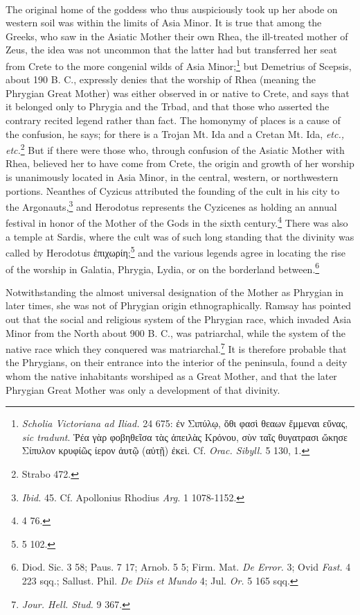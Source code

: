 \documentclass[a4paper, 11pt, oneside, polutonikogreek, english]{article}
\begin{document}
\paragraph{}
The original home of the goddess who thus auspiciously took up her abode on western soil was within the limits of Asia Minor. It is true that among the Greeks, who saw in the Asiatic Mother their own Rhea, the ill-treated mother of Zeus, the idea was not uncommon that the latter had but transferred her seat from Crete to the more congenial wilds of Asia Minor;\footnote{\emph{Scholia Victoriana ad Iliad.} 24 675: ἐν Σιπύλῳ, ὅθι φασὶ θεαων ἔμμεναι εὔνας, \emph{sic tradunt}. Ῥέα γὰρ φοβηθεῖσα τὰς ἀπειλὰς Κρόνου, σὺν ταῖς θυγατρασι ὤκησε Σίπυλον κρυφίῶς ίερον ἀυτῷ (αὐτῇ) ἐκεὶ. Cf. \emph{Orac. Sibyll.} 5 130, 1.} but Demetrius of Scepsis, about 190 B. C., expressly denies that the worship of Rhea (meaning the Phrygian Great Mother) was either observed in or native to Crete, and says that it belonged only to Phrygia and the Trbad, and that those who asserted the contrary recited legend rather than fact. The homonymy of places is a cause of the confusion, he says; for there is a Trojan Mt. Ida and a Cretan Mt. Ida, \emph{etc., etc.}\footnote{Strabo 472.} But if there were those who, through confusion of the Asiatic Mother with Rhea, believed her to have come from Crete, the origin and growth of her worship is unanimously located in Asia Minor, in the central, western, or northwestern portions. Neanthes of Cyzicus attributed the founding of the cult in his city to the Argonauts,\footnote{\emph{Ibid.} 45. Cf. Apollonius Rhodius \emph{Arg.} 1 1078-1152.} and Herodotus represents the Cyzicenes as holding an annual festival in honor of the Mother of the Gods in the sixth century.\footnote{4 76.} There was also a temple at Sardis, where the cult was of such long standing that the divinity was called by Herodotus ἐπιχωρίη;\footnote{5 102.} and the various legends agree in locating the rise of the worship in Galatia, Phrygia, Lydia, or on the borderland between.\footnote{Diod. Sic. 3 58; Paus. 7 17; Arnob. 5 5; Firm. Mat. \emph{De Error.} 3; Ovid \emph{Fast.} 4 223 sqq.; Sallust. Phil. \emph{De Diis et Mundo} 4; Jul. \emph{Or.} 5 165 sqq.}

Notwithstanding the almost universal designation of the Mother as Phrygian in later times, she was not of Phrygian origin ethnographically. Ramsay has pointed out that the social and religious system of the Phrygian race, which invaded Asia Minor from the North about 900 B. C., was patriarchal, while the system of the native race which they conquered was matriarchal.\footnote{\emph{Jour. Hell. Stud.} 9 367.} It is therefore probable that the Phrygians, on their entrance into the interior of the peninsula, found a deity whom the native inhabitants worshiped as a Great Mother, and that the later Phrygian Great Mother was only a development of that divinity.
\end{document}
